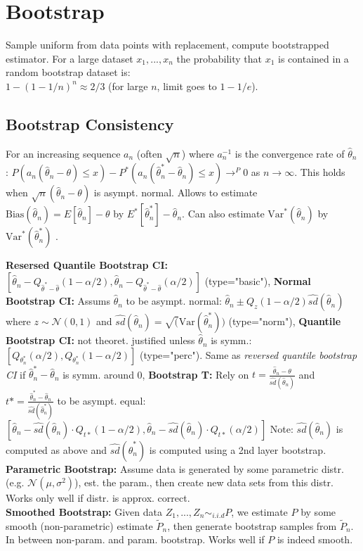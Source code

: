 \section*{Bootstrap}
Sample uniform from data points with replacement, compute bootstrapped estimator. For a large dataset $x_1, ..., x_n$ the probability that $x_1$ is contained in a random bootstrap dataset is: \\
$1-(1-1/n)^n \approx 2/3$ (for large $n$, limit goes to $1-1/e$).
\subsection*{Bootstrap Consistency}
For an increasing sequence $a_n$ (often $\sqrt{n}$) where $a_n^{-1}$ is the convergence rate of $\hat \theta_n$:
$P(a_n(\hat \theta_n - \theta) \leq x) - P^*(a_n(\hat \theta_n^* - \hat \theta_n) \leq x) \to^P 0$ as $n\to \infty$. This holds when $\sqrt{n}(\hat \theta_n - \theta)$ is asympt. normal. Allows to estimate $\text{Bias}(\hat \theta_n) = E[\hat \theta_n] - \theta$ by $E^*[\hat \theta^*_n] - \hat \theta_n$. Can also estimate $\text{Var}^*(\hat\theta_n)$ by $\text{Var}^*(\hat\theta^*_n)$ .

\textbf{Resersed Quantile Bootstrap CI:} $[\hat \theta_n - Q_{\hat \theta^* - \hat \theta}(1- \alpha / 2), \hat \theta_n - Q_{\hat \theta^* - \hat \theta}(\alpha / 2)]$ (type="basic"), \textbf{Normal Bootstrap CI:} Assums $\hat\theta_n$ to be asympt. normal: $\hat\theta_n \pm Q_z(1-\alpha / 2)\hat{sd}(\hat\theta_n)$ where $z \sim \mathcal{N}(0,1)$ and $\hat{sd}(\hat\theta_n)=\sqrt ({\text{Var}(\hat\theta_n^*)})$ (type="norm"), \textbf{Quantile Bootstrap CI:} not theoret. justified unless $\hat\theta_n$ is symm.:
$[Q_{\theta_n^*}(\alpha / 2), Q_{\theta_n^*}(1-\alpha / 2)]$ (type="perc"). Same as \textit{reversed quantile bootstrap CI} if $\hat\theta_n^* - \hat\theta_n$ is symm. around 0, \textbf{Bootstrap T:} Rely on $t=\frac{\hat\theta_n -\theta}{\hat {sd}(\hat\theta_n)}$ and $t*=\frac{\hat\theta_n^*-\hat\theta_n}{\hat{sd}(\hat\theta_n^*)}$ to be asympt. equal: $[\hat\theta_n - \hat{sd}(\hat\theta_n) \cdot Q_{t*}(1-\alpha / 2), \hat\theta_n - \hat{sd}(\hat\theta_n) \cdot Q_{t*}(\alpha / 2)]$ Note: $\hat{sd}(\hat\theta_n)$ is computed as above and $\hat{sd}(\hat\theta^*_n)$ is computed using a 2nd layer bootstrap.
\\
\textbf{Parametric Bootstrap:}
Assume data is generated by some parametric distr. (e.g. $\mathcal{N}(\mu, \sigma^2)$), est. the param., 
then create new data sets from this distr. Works only well if distr. is approx. correct.\\
\textbf{Smoothed Bootstrap:}
Given data $Z_1,...,Z_n \sim_{i.i.d} P$, we estimate $P$ by some smooth (non-parametric) estimate $\tilde P_n$, then generate bootstrap samples from $\tilde P_n$. In between non-param. and param. bootstrap. Works well if $P$ is indeed smooth.

